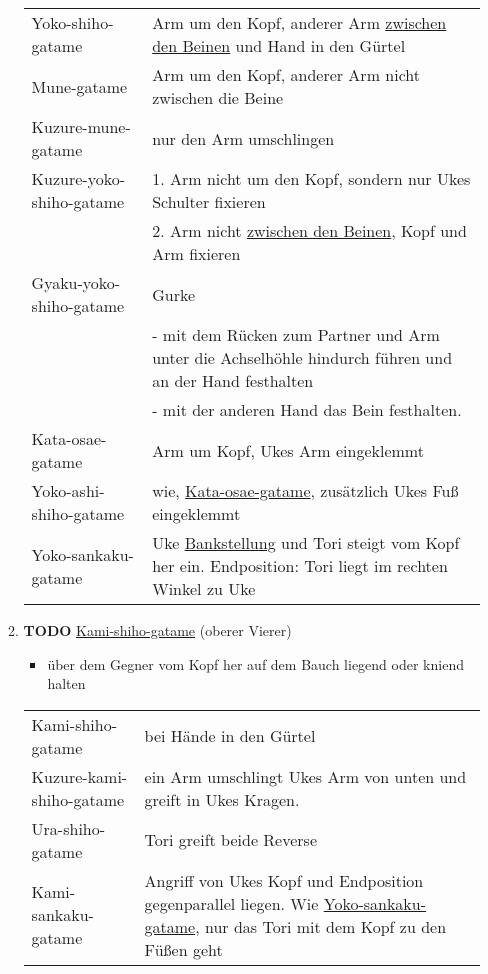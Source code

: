 \documentclass[11pt]{article}
\begin{document}
\begin{enumerate}
\begin{enumerate}
\begin{center}
\begin{tabular}{ll}
\label{org6ebb80c}Yoko-shiho-gatame & Arm um den Kopf, anderer Arm \hyperref[orgd3451e7]{zwischen den Beinen} und Hand in den Gürtel\\
\label{orgaf7dc4e}Mune-gatame & Arm um den Kopf, anderer Arm nicht zwischen die Beine\\
\label{orgbc77a84}Kuzure-mune-gatame & nur den Arm umschlingen\\
\label{orgbf5a1de}Kuzure-yoko-shiho-gatame & 1. Arm nicht um den Kopf, sondern nur Ukes Schulter fixieren\\
 & 2. Arm nicht \hyperref[orgd3451e7]{zwischen den Beinen}, Kopf und Arm fixieren\\
\label{orgaf24e04}Gyaku-yoko-shiho-gatame & \label{org68a906c}Gurke\\
 & - mit dem Rücken zum Partner und Arm unter die Achselhöhle hindurch führen und an der Hand festhalten\\
 & - mit der anderen Hand das Bein festhalten.\\
\label{org3ed6c8f}Kata-osae-gatame & Arm um Kopf, Ukes Arm eingeklemmt\\
\label{orgfd3884e}Yoko-ashi-shiho-gatame & wie, \hyperref[org3ed6c8f]{Kata-osae-gatame}, zusätzlich Ukes Fuß eingeklemmt\\
\label{orge789cfc}Yoko-sankaku-gatame & Uke \hyperref[orgbc37293]{Bankstellung} und Tori steigt vom Kopf her ein. Endposition: Tori liegt im rechten Winkel zu Uke\\
\end{tabular}
\end{center}

\item {\bfseries\sffamily TODO} \hyperref[org22a024c]{Kami-shiho-gatame} (oberer Vierer)
\label{sec:org1d34853}

\begin{itemize}
\item über dem Gegner vom Kopf her auf dem Bauch liegend oder kniend halten
\end{itemize}

\begin{center}
\begin{tabular}{ll}
\label{org22a024c}Kami-shiho-gatame & bei Hände in den Gürtel\\
\label{org32acce5}Kuzure-kami-shiho-gatame & ein Arm umschlingt Ukes Arm von unten und greift in Ukes Kragen.\\
\label{org374da7d}Ura-shiho-gatame & Tori greift beide Reverse\\
\label{org0859ddc}Kami-sankaku-gatame & Angriff von Ukes Kopf und Endposition gegenparallel liegen. Wie \hyperref[orge789cfc]{Yoko-sankaku-gatame}, nur das Tori mit dem Kopf zu den Füßen geht\\
\end{tabular}
\end{center}


\end{enumerate}
\end{enumerate}
\end{document}
